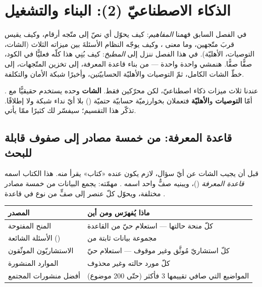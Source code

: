\section{الذكاء الاصطناعيّ (2): البناء والتشغيل}

في الفصل السابق فهمنا \emph{المفاهيم}: كيف يحوّل  أي نصّ إلى متّجه
أرقام، وكيف يقيس  قربَ متّجهين، وما معنى ، وكيف يوجّه النظام
الأسئلةَ بين ميزاته الثلاث (الشات، التوصيات، الأهليّة). في هذا الفصل ننزل إلى
\emph{المطبخ}: كيف بُنِي هذا كلّه فعليًّا في الكود، صفًّا صفًّا. هنمشي واحدة واحدة —
من بناء قاعدة المعرفة، إلى تخزين المتّجهات، إلى خطّ الشات الكامل، ثمّ التوصيات
والأهليّة الحسابيّتين، وأخيرًا شبكة الأمان والتكلفة.

\begin{idea}
عندنا ثلاث ميزات ذكاء اصطناعيّ، لكن محرّكين فقط. \textbf{الشات} وحده يستخدم
 حقيقيًّا مع . أمّا \textbf{التوصيات} و\textbf{الأهليّة}
فتعملان بخوارزميّة حسابيّة حتميّة () بلا أيّ نداء شبكة ولا
 إطلاقًا. تذكّر هذا التقسيم؛ سيفسّر لك كثيرًا ممّا يأتي.
\end{idea}

\subsection{قاعدة المعرفة: من خمسة مصادر إلى صفوف قابلة للبحث}

قبل أن يجيب الشات عن أيّ سؤال، لازم يكون عنده «كتاب» يقرأ منه. هذا الكتاب اسمه
\emph{قاعدة المعرفة} ()، ويبنيه صفٌّ واحد اسمه
. مهمّته: يجمع البيانات من خمسة مصادر مختلفة، ويحوّل كلّ
عنصر إلى صفٍّ من نوع  في قاعدة .

\begin{center}
\begin{tabular}{L{4.2cm} L{8.4cm}}
\toprule
\textbf{\color{spPrimary}المصدر} & \textbf{\color{spPrimary}ماذا يُفهرَس ومن أين} \\
\midrule
المنح المفتوحة & كلّ منحة حالتها  — استعلام حيّ من القاعدة \\
الأسئلة الشائعة () & مجموعة بيانات ثابتة من  \\
الاستشاريّون الموثّقون & كلّ استشاريّ مُوثَّق وغير موقوف — استعلام حيّ \\
الموارد المنشورة & كلّ مورد حالته  وغير محذوف \\
أفضل منشورات المجتمع & المواضيع التي صافي تقييمها 3 فأكثر (حتّى 200 موضوع) \\
\bottomrule
\end{tabular}
\end{center}

